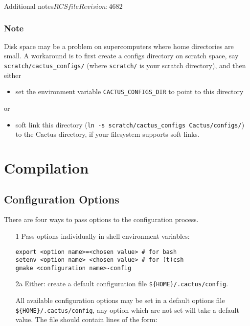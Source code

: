 \begin{cactuspart}{Additional notes}{$RCSfile$}{$Revision: 4682 $}
\subsection{Note}
Disk space may be a problem on supercomputers where home directories are small.
A workaround is to first create a
configs directory on scratch space, say \texttt{scratch/cactus\_configs/} (where
\texttt{scratch/} is your scratch directory), and then either
\begin{itemize}
\item{} set the environment variable \texttt{CACTUS\_CONFIGS\_DIR} to point to
this directory
\end{itemize}
or
\begin{itemize}
\item{}  soft link this directory (\texttt{ln -s
scratch/cactus\_configs Cactus/configs/}) to the Cactus directory, if your
filesystem supports soft links.
\end{itemize}


\chapter{Compilation}


\section{Configuration Options}
\label{sec:confopts}

There are four ways to pass options to the configuration process.
\begin{enumerate}
  \item[1]{}
    Pass options individually in shell environment variables:

    {\tt export <option name>=<chosen value>    \# for bash}\\
    {\tt setenv <option name> <chosen value>    \# for (t)csh}\\
    {\tt gmake <configuration name>-config}

  \item[2a]{}
    Either: create a default configuration file \texttt{\$\{HOME\}/.cactus/config}.

    All available configuration options may be set in a default options file
    \texttt{\$\{HOME\}/.cactus/config}, any option which are not set will take a
    default value. The file should contain lines of the form:


\end{enumerate}
\end{cactuspart}
